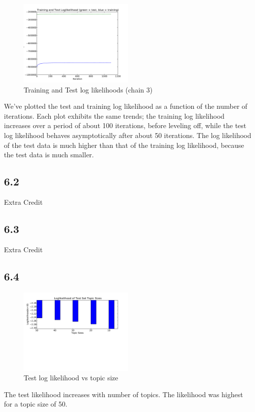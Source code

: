 \documentclass{article}
\begin{document}
\begin{figure}[H]
  \caption{Training and Test log likelihoods (chain 3)}
  \centering
    \includegraphics[width=0.5\textwidth]{q6_p1_2.pdf}
\end{figure}

We've plotted the test and training log likelihood as a function of
the number of iterations. Each plot exhibits the same trends; the training log likelihood increases over a period
of about 100 iterations, before leveling off, while the test log likelihood behaves asymptotically after about 50 iterations. The
log likelihood of the test data is much higher than that of the training log likelihood, because the test data is much smaller.

\subsection*{6.2}

Extra Credit

\subsection*{6.3}

Extra Credit

\subsection*{6.4}
\begin{figure}[H]
  \caption{Test log likelihood vs topic size}
  \centering
    \includegraphics[width=0.5\textwidth]{q6_p4.pdf}
\end{figure}
The test likelihood increases with number of topics. The likelihood was highest for a topic size of 50.
\end{document}

